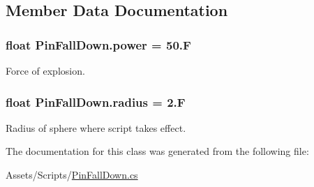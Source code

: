 \subsection{Member Data Documentation}
\hypertarget{class_pin_fall_down_a8658bded276508aad0b6297af75b5d56}{}
\subsubsection[{power}]{\setlength{\rightskip}{0pt plus 5cm}float Pin\+Fall\+Down.\+power = 50.\+F}\label{class_pin_fall_down_a8658bded276508aad0b6297af75b5d56}


Force of explosion. 

\hypertarget{class_pin_fall_down_aa89b8c30295e795a3355e45fd4def19e}{}
\subsubsection[{radius}]{\setlength{\rightskip}{0pt plus 5cm}float Pin\+Fall\+Down.\+radius = 2.\+F}\label{class_pin_fall_down_aa89b8c30295e795a3355e45fd4def19e}


Radius of sphere where script takes effect. 



The documentation for this class was generated from the following file\+:\begin{DoxyCompactItemize}
\item 
Assets/\+Scripts/\hyperlink{_pin_fall_down_8cs}{Pin\+Fall\+Down.\+cs}\end{DoxyCompactItemize}

